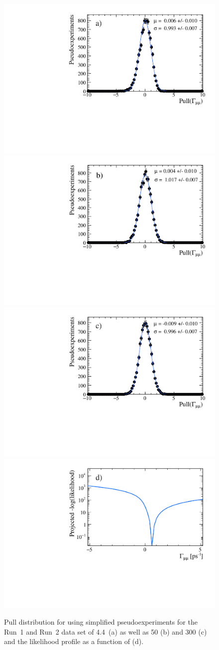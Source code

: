 {\begin{figure}[tbp]
    \centering
       \includegraphics[width=0.49 \textwidth]{./Figs/LifetimeMeasurement/CKM_simple_gamma_pull.pdf}
     \includegraphics[width= 0.49 \textwidth]{./Figs/LifetimeMeasurement/50fb_gamma_pull.pdf}
      \includegraphics[width=0.49 \textwidth]{./Figs/LifetimeMeasurement/300fb_simple_gamma_pull.pdf}
        \includegraphics[width= 0.49 \textwidth]{./Figs/LifetimeMeasurement/Gamma_LL.pdf}  

  \caption{Pull distribution for \Gmumu using simplified pseudoexperiments for the Run~1 and Run~2 data set of 4.4~\fb (a) as well as 50 (b) and 300 (c) \fb and the likelihood profile as a function of \Gmumu (d).}
    \label{fig:gammapulls}
\end{figure}




}
